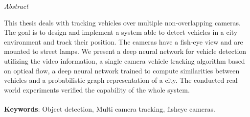 \vfill
\begin{center}
{\it \large Abstract}
\vspace{0.2cm}

\begin{minipage}{0.8\textwidth}{

This thesis deals with tracking vehicles over multiple non-overlapping cameras. The goal is to design and implement a system able to detect vehicles in a city environment and track their position. The cameras have a fish-eye view and are mounted to street lamps. We present a deep neural network for vehicle detection utilizing the video information, a single camera vehicle tracking algorithm based on optical flow, a deep neural network trained to compute similarities between vehicles and a probabilistic graph representation of a city. The conducted real world experiments verified the capability of the whole system.
\\
\\
\textbf{Keywords}: Object detection, Multi camera tracking, fisheye cameras.
}
\end{minipage}
\end{center}
\vfill
\vspace{1cm}

